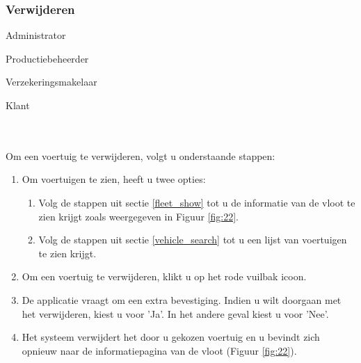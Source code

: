 \documentclass[11pt,openany]{article}
\newcommand{\cmark}{\ding{51}}%
\newcommand{\xmark}{\ding{55}}%
\newcommand{\done}{\rlap{$\square$}{\raisebox{2pt}{\large\hspace{1pt}\cmark}}%
	\hspace{-2.5pt}}
\newcommand{\wontfix}{\rlap{$\square$}{\large\hspace{1pt}\xmark}}
\begin{document}
\subsubsection{Verwijderen}
\begin{todolist}
	\item[\done] Administrator
	\item[\done] Productiebeheerder
	\item[\done] Verzekeringsmakelaar
	\item[\wontfix] Klant 
\end{todolist}
\\
\\
Om een voertuig te verwijderen, volgt u onderstaande stappen:
\begin{enumerate}
	\item Om voertuigen te zien, heeft u twee opties:
	\begin{enumerate}
		\item Volg de stappen uit sectie \ref{fleet_show} tot u de informatie van de vloot te zien krijgt zoals weergegeven in Figuur \ref{fig:22}.
		\item Volg de stappen uit sectie \ref{vehicle_search} tot u een lijst van voertuigen te zien krijgt.
	\end{enumerate}
	\item Om een voertuig te verwijderen, klikt u op het rode vuilbak icoon. 
	\item De applicatie vraagt om een extra bevestiging. Indien u wilt doorgaan met het verwijderen, kiest u voor 'Ja'. In het andere geval kiest u voor 'Nee'.
	\item Het systeem verwijdert het door u gekozen voertuig en u bevindt zich opnieuw naar de informatiepagina van de vloot (Figuur \ref{fig:22}).
\end{enumerate}
\end{document}
